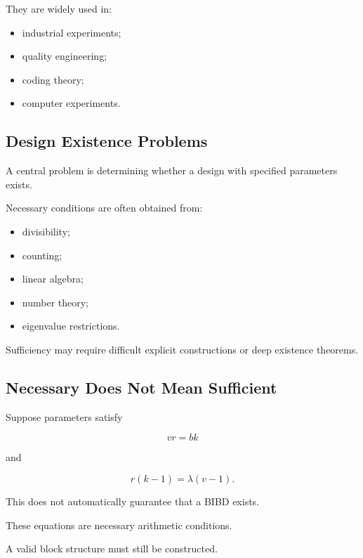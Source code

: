 They are widely used in:

\begin{itemize}
    \item industrial experiments;
    \item quality engineering;
    \item coding theory;
    \item computer experiments.
\end{itemize}

\subsection{Design Existence Problems}
\label{subsec:design-existence-problems}

A central problem is determining whether a design with specified
parameters exists.

Necessary conditions are often obtained from:

\begin{itemize}
    \item divisibility;
    \item counting;
    \item linear algebra;
    \item number theory;
    \item eigenvalue restrictions.
\end{itemize}

Sufficiency may require difficult explicit constructions or deep
existence theorems.

\subsection{Necessary Does Not Mean Sufficient}
\label{subsec:necessary-not-sufficient-design}

Suppose parameters satisfy

\[
vr=bk
\]

and

\[
r(k-1)=\lambda(v-1).
\]

This does not automatically guarantee that a BIBD exists.

These equations are necessary arithmetic conditions.

A valid block structure must still be constructed.

